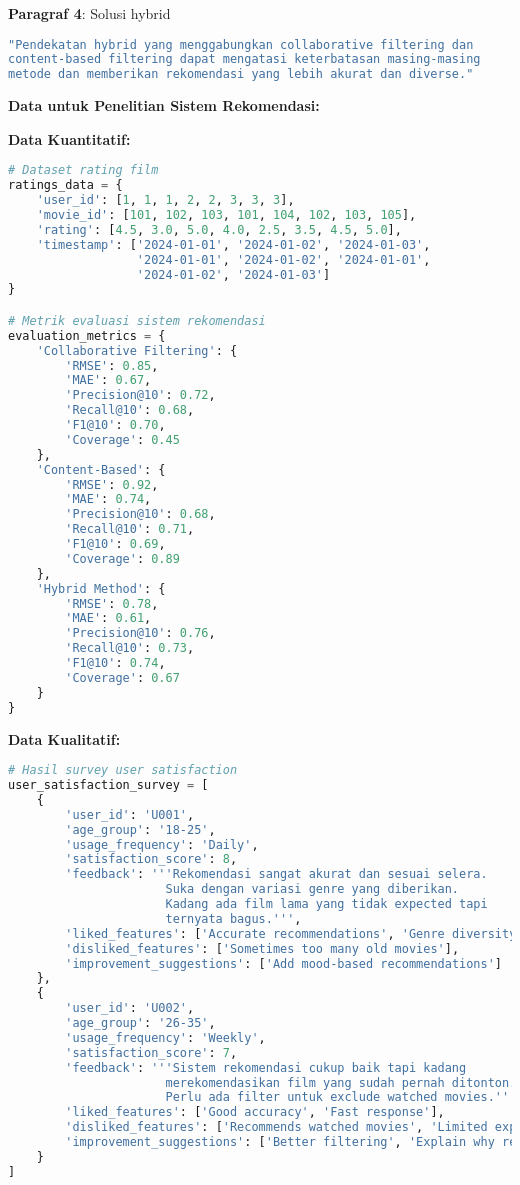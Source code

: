 \textbf{Paragraf 4}: Solusi hybrid
\begin{lstlisting}[language=bash, style=bash, caption=Solusi Hybrid yang Diusulkan]
"Pendekatan hybrid yang menggabungkan collaborative filtering dan
content-based filtering dapat mengatasi keterbatasan masing-masing
metode dan memberikan rekomendasi yang lebih akurat dan diverse."
\end{lstlisting}

\textbf{Data untuk Penelitian Sistem Rekomendasi:}

\textbf{Data Kuantitatif:}
\begin{lstlisting}[language=python, style=python, caption=Data Kuantitatif Sistem Rekomendasi]
# Dataset rating film
ratings_data = {
    'user_id': [1, 1, 1, 2, 2, 3, 3, 3],
    'movie_id': [101, 102, 103, 101, 104, 102, 103, 105],
    'rating': [4.5, 3.0, 5.0, 4.0, 2.5, 3.5, 4.5, 5.0],
    'timestamp': ['2024-01-01', '2024-01-02', '2024-01-03',
                  '2024-01-01', '2024-01-02', '2024-01-01',
                  '2024-01-02', '2024-01-03']
}

# Metrik evaluasi sistem rekomendasi
evaluation_metrics = {
    'Collaborative Filtering': {
        'RMSE': 0.85,
        'MAE': 0.67,
        'Precision@10': 0.72,
        'Recall@10': 0.68,
        'F1@10': 0.70,
        'Coverage': 0.45
    },
    'Content-Based': {
        'RMSE': 0.92,
        'MAE': 0.74,
        'Precision@10': 0.68,
        'Recall@10': 0.71,
        'F1@10': 0.69,
        'Coverage': 0.89
    },
    'Hybrid Method': {
        'RMSE': 0.78,
        'MAE': 0.61,
        'Precision@10': 0.76,
        'Recall@10': 0.73,
        'F1@10': 0.74,
        'Coverage': 0.67
    }
}
\end{lstlisting}

\textbf{Data Kualitatif:}
\begin{lstlisting}[language=python, style=python, caption=Data Kualitatif User Satisfaction]
# Hasil survey user satisfaction
user_satisfaction_survey = [
    {
        'user_id': 'U001',
        'age_group': '18-25',
        'usage_frequency': 'Daily',
        'satisfaction_score': 8,
        'feedback': '''Rekomendasi sangat akurat dan sesuai selera.
                      Suka dengan variasi genre yang diberikan.
                      Kadang ada film lama yang tidak expected tapi
                      ternyata bagus.''',
        'liked_features': ['Accurate recommendations', 'Genre diversity'],
        'disliked_features': ['Sometimes too many old movies'],
        'improvement_suggestions': ['Add mood-based recommendations']
    },
    {
        'user_id': 'U002',
        'age_group': '26-35',
        'usage_frequency': 'Weekly',
        'satisfaction_score': 7,
        'feedback': '''Sistem rekomendasi cukup baik tapi kadang
                      merekomendasikan film yang sudah pernah ditonton.
                      Perlu ada filter untuk exclude watched movies.''',
        'liked_features': ['Good accuracy', 'Fast response'],
        'disliked_features': ['Recommends watched movies', 'Limited explanation'],
        'improvement_suggestions': ['Better filtering', 'Explain why recommended']
    }
]
\end{lstlisting}

